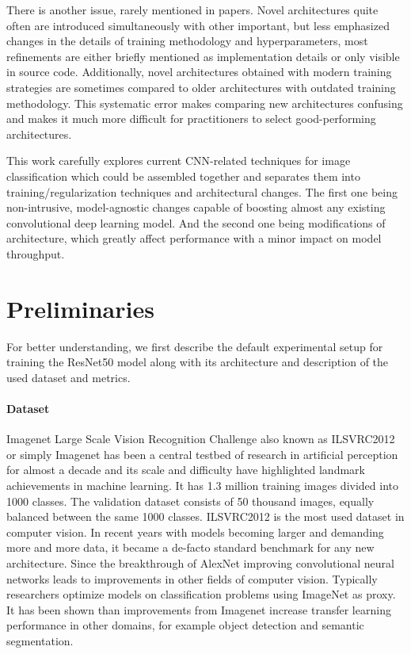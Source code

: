 There is another issue, rarely mentioned in papers. Novel architectures quite often are introduced simultaneously with other important, but less emphasized changes in the details of training methodology and hyperparameters, most refinements are either briefly mentioned as implementation details or only visible in source code. Additionally, novel architectures obtained with modern training strategies are sometimes compared to older architectures with outdated training methodology. This systematic error makes comparing new architectures confusing and makes it much more difficult for practitioners to select good-performing architectures. 


This work carefully explores current CNN-related techniques for image classification which could be assembled together and separates them into training/regularization techniques and architectural changes. The first one being non-intrusive, model-agnostic changes capable of boosting almost any existing convolutional deep learning model. And the second one being modifications of architecture, which greatly affect performance with a minor impact on model throughput. 



\section{Preliminaries} \label{sec: preliminaries}
For better understanding, we first describe the default experimental setup for training the ResNet50 model along with its architecture and description of the used dataset and metrics. 

\paragraph{Dataset} \label{subsec: imagenet}


Imagenet Large Scale Vision Recognition Challenge also known as ILSVRC2012 or simply Imagenet has been a central testbed of research in artificial perception for almost a decade and its scale and difficulty have highlighted landmark achievements in machine learning. It has 1.3 million training images divided into 1000 classes. The validation dataset consists of 50 thousand images, equally balanced between the same 1000 classes. ILSVRC2012 is the most used dataset in computer vision. %
In recent years with models becoming larger and demanding more and more data, it became a de-facto standard benchmark for any new architecture. Since the breakthrough of AlexNet improving convolutional neural networks leads to improvements in other fields of computer vision. Typically researchers optimize models on classification problems using ImageNet \cite{deng2009_imagenet} as proxy. It has been shown \cite{he2019_bag_of_tricks} \cite{kornblith2019_better} than improvements from Imagenet increase transfer learning performance in other domains, for example object detection and semantic segmentation.


